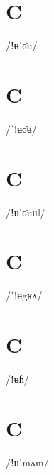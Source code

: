 \documentclass[10pt,a4paper,twoside]{book}
\begin{document}
\section*{C}

\begin{multicols}{3}
 {/ǃʉˈʛu/} {}
\end{multicols}

\section*{C}

\begin{multicols}{3}
 {/ˈǃʉʛʉ/} {}
\end{multicols}

\section*{C}

\begin{multicols}{3}
 {/ǃʉˈʛuʉǁ/} {}
\end{multicols}

\section*{C}

\begin{multicols}{3}
 {/ˈǃʉgʁʌ/} {}
\end{multicols}

\section*{C}

\begin{multicols}{3}
 {/ǃʉɦ/} {}
\end{multicols}

\section*{C}

\begin{multicols}{3}
 {/ǃʉˈmʌm/} {}
\end{multicols}
\end{document}
